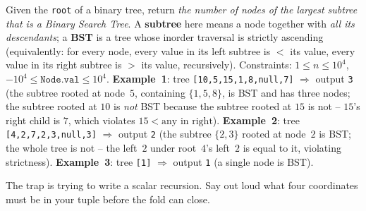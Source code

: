 \begin{problemstatement}
Given the \texttt{root} of a binary tree, return \emph{the number of nodes of
the largest subtree that is a Binary Search Tree}. A \textbf{subtree} here
means a node together with \emph{all its descendants}; a \textbf{BST} is a
tree whose inorder traversal is strictly ascending (equivalently: for every
node, every value in its left subtree is $<$ its value, every value in its
right subtree is $>$ its value, recursively). Constraints: $1\le n\le 10^{4}$,
$-10^{4}\le \texttt{Node.val}\le 10^{4}$. \textbf{Example~1}: tree
\texttt{[10,5,15,1,8,null,7]} $\Rightarrow$ output \texttt{3} (the subtree
rooted at node~$5$, containing $\{1,5,8\}$, is BST and has three nodes; the
subtree rooted at $10$ is \emph{not} BST because the subtree rooted at $15$
is not -- $15$'s right child is $7$, which violates $15<\text{any in right}$).
\textbf{Example~2}: tree \texttt{[4,2,7,2,3,null,3]} $\Rightarrow$ output
\texttt{2} (the subtree $\{2,3\}$ rooted at node~$2$ is BST; the whole tree
is not -- the left~$2$ under root~$4$'s left~$2$ is equal to it, violating
strictness). \textbf{Example~3}: tree \texttt{[1]} $\Rightarrow$ output
\texttt{1} (a single node is BST).
\end{problemstatement}

\begin{attemptgate}
The trap is trying to write a scalar recursion. Say out loud what four
coordinates must be in your tuple before the fold can close.
\end{attemptgate}

